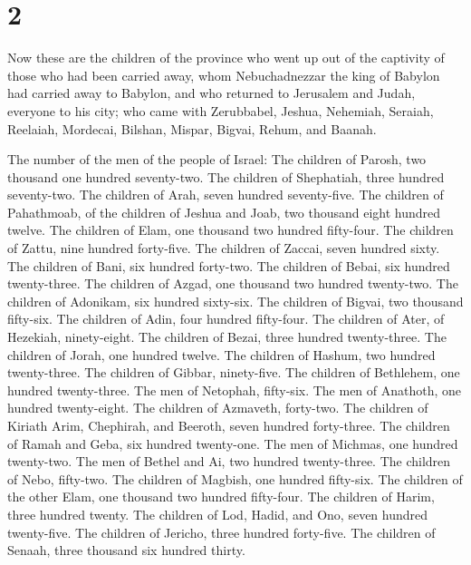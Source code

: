 \hypertarget{section-1}{%
\section{2}\label{section-1}}

 Now these are the children of the province who went up
out of the captivity of those who had been carried away, whom
Nebuchadnezzar the king of Babylon had carried away to Babylon, and who
returned to Jerusalem and Judah, everyone to his city; 
who came with Zerubbabel, Jeshua, Nehemiah, Seraiah, Reelaiah, Mordecai,
Bilshan, Mispar, Bigvai, Rehum, and Baanah.

The number of the men of the people of Israel:  The
children of Parosh, two thousand one hundred seventy-two. 
The children of Shephatiah, three hundred seventy-two. 
The children of Arah, seven hundred seventy-five.  The
children of Pahathmoab, of the children of Jeshua and Joab, two thousand
eight hundred twelve.  The children of Elam, one thousand
two hundred fifty-four.  The children of Zattu, nine
hundred forty-five.  The children of Zaccai, seven hundred
sixty.  The children of Bani, six hundred forty-two.
 The children of Bebai, six hundred twenty-three.
 The children of Azgad, one thousand two hundred
twenty-two.  The children of Adonikam, six hundred
sixty-six.  The children of Bigvai, two thousand
fifty-six.  The children of Adin, four hundred
fifty-four.  The children of Ater, of Hezekiah,
ninety-eight.  The children of Bezai, three hundred
twenty-three.  The children of Jorah, one hundred twelve.
 The children of Hashum, two hundred twenty-three.
 The children of Gibbar, ninety-five.  The
children of Bethlehem, one hundred twenty-three.  The men
of Netophah, fifty-six.  The men of Anathoth, one hundred
twenty-eight.  The children of Azmaveth, forty-two.
 The children of Kiriath Arim, Chephirah, and Beeroth,
seven hundred forty-three.  The children of Ramah and
Geba, six hundred twenty-one.  The men of Michmas, one
hundred twenty-two.  The men of Bethel and Ai, two
hundred twenty-three.  The children of Nebo, fifty-two.
 The children of Magbish, one hundred fifty-six.
 The children of the other Elam, one thousand two hundred
fifty-four.  The children of Harim, three hundred twenty.
 The children of Lod, Hadid, and Ono, seven hundred
twenty-five.  The children of Jericho, three hundred
forty-five.  The children of Senaah, three thousand six
hundred thirty.

